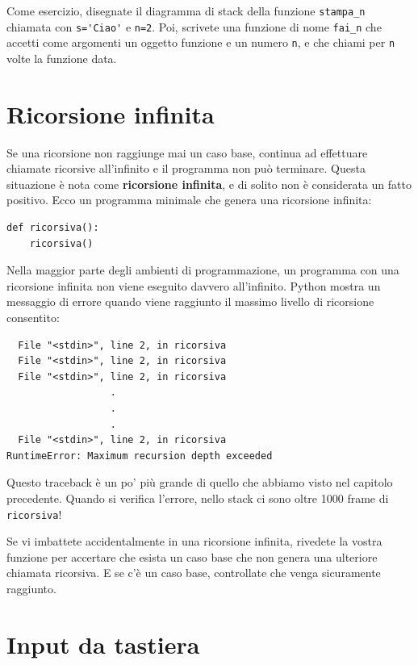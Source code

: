 \documentclass[10pt]{book}
\begin{document}
Come esercizio, disegnate il diagramma di stack della funzione \verb"stampa_n" chiamata con \verb"s='Ciao'" e {\tt n=2}. Poi, scrivete una funzione di nome \verb"fai_n" che accetti come argomenti un oggetto funzione e un numero {\tt n}, e che chiami per {\tt n} volte la funzione data.


\section{Ricorsione infinita}


Se una ricorsione non raggiunge mai un caso base, continua ad effettuare chiamate ricorsive all'infinito e il programma non può terminare. Questa situazione è nota come {\bf ricorsione infinita}, e di solito non è considerata un fatto positivo.
Ecco un programma minimale che genera una ricorsione infinita:

\begin{verbatim}
def ricorsiva():
    ricorsiva()
\end{verbatim}
%
Nella maggior parte degli ambienti di programmazione, un programma con una ricorsione infinita non viene eseguito davvero all'infinito. Python mostra un messaggio di errore quando viene raggiunto il massimo livello di ricorsione consentito:

\begin{verbatim}
  File "<stdin>", line 2, in ricorsiva
  File "<stdin>", line 2, in ricorsiva
  File "<stdin>", line 2, in ricorsiva
                  .   
                  .
                  .
  File "<stdin>", line 2, in ricorsiva
RuntimeError: Maximum recursion depth exceeded
\end{verbatim}
%
Questo traceback è un po' più grande di quello che abbiamo visto nel capitolo precedente. Quando si verifica l'errore, nello stack ci sono oltre 1000 frame di {\tt ricorsiva}!

Se vi imbattete accidentalmente in una ricorsione infinita, rivedete la vostra funzione per accertare che esista un caso base che non genera una ulteriore chiamata ricorsiva. E se c'è un caso base, controllate che venga sicuramente raggiunto.

\section{Input da tastiera}
\end{document}
